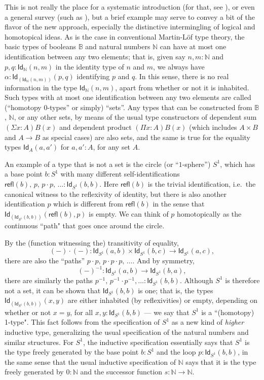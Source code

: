 \documentclass[11pt]{article}
\newcommand{\B}{\ensuremath{\mathbb{B}}}
\newcommand{\N}{\ensuremath{\mathbb{N}}}
\newcommand{\Id}{\mathsf{Id}}
\newcommand{\id}[1]{\Id_{#1}}
\newcommand{\refl}{\mathsf{refl}}
\theoremstyle{remark}
\theoremstyle{definition}
\begin{document}
This is not really the place for a systematic introduction (for that, see \cite{HoTTbook}), or even a general survey (such as \cite{apw,pw}), but a brief example may serve to convey a bit of the flavor of the new approach, especially the distinctive intermingling of logical and homotopical ideas.  As is the case in conventional Martin-L\"of type theory, the basic types of booleans $\B$ and natural numbers $\N$ can have at most one identification between any two elements; that is, given say $n, m : \N$ and $p,q: \id{\N}(n,m)$ in the identity type of $n$ and $m$, we always have $\alpha:\id{\left(\id{\N}(n,m)\right)}(p,q)$ identifying $p$ and $q$.  In this sense, there is no real information in the type $\id{\N}(n,m)$, apart from whether or not it is inhabited.  Such types with at most one identification between any two elements are called (``homotopy 0-types'' or simply) ``sets''.  Any types that can be constructed from $\B$, $\N$, or any other sets, by means of the usual type constructors of dependent sum $(\Sigma{x:A})B(x)$ and dependent product $(\Pi{x:A})B(x)$ (which includes $A\times B$ and $A\rightarrow B$ as special cases) are also sets, and the same is true for the equality types $\id{A}(a,a')$ for $a,a':A$, for any set $A$.  

 An example of a type that is not a set is the circle (or ``$1$-sphere'') $S^1$, which has a base point $b: S^1$ with many different self-identifications $\refl(b),\, p,\, p\cdot p,\, ... :\id{S^1}(b,b)$.  Here $\refl(b)$ is the trivial identification, i.e.\ the canonical witness to the reflexivity of identity, but there is also another identification $p$ which is different from $\refl(b)$ in the sense that $\id{\left(\id{S^1}(b,b)\right)}(\refl(b), p)$ is empty.  We can think of $p$ homotopically as the continuous ``path" that goes once around the circle. 

%
%

By the (function witnessing the) transitivity of equality, 
\[
(-)\cdot(-) : \id{S^1}(a,b) \times \id{S^1}(b,c)\to \id{S^1}(a,c),
\]
 there are also the ``paths'' $p\cdot p,\, p\cdot p\cdot p,\, \ldots$.   And by symmetry,
 \[
 (-)^{-1}:\id{S^1}(a,b) \to \id{S^1}(b,a),
 \]
 there are similarly the paths $p^{-1},\, p^{-1}\cdot p^{-1}, \ldots :\id{S^1}(b,b)$.  Although $S^1$ is therefore not a set, it can be shown that $\id{S^1}(b,b)$ is one; that is, the types $\id{\left(\id{S^1}(b,b)\right)}(x,y)$ are either inhabited (by reflexivities) or empty, depending on whether or not $x=y$, for all $x,y : \id{S^1}(b,b)$ --- we say that $S^1$ is a ``(homotopy) 1-type".  This fact follows from the specification of $S^1$ as a new kind of \emph{higher} inductive type, generalizing the usual specification of the natural numbers and similar structures.  For $S^1$, the inductive specification essentially says that $S^1$ is the type freely generated by the base point $b:S^1$ and the loop $p:\id{S^1}(b,b)$, in the same sense that the usual inductive specification of $\N$ says that it is the type freely generated by $0:\N$ and the successor function $s:\N\to\N$.  
  
\end{document}
